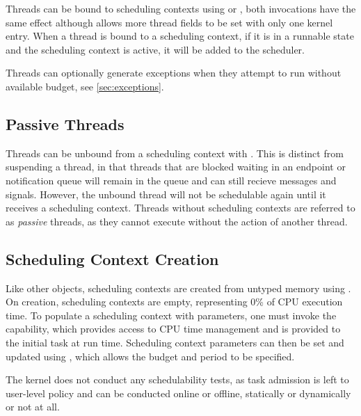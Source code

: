 Threads can be bound to scheduling contexts using  or
, both invocations have the same effect although  allows more thread fields to be set with only one kernel entry.
When a thread is bound to a scheduling context, if it is in a runnable state and the scheduling context is active, it will be added to the scheduler.

Threads can optionally generate exceptions when they attempt to run without available budget, see \autoref{sec:exceptions}.

\subsection{Passive Threads}
\label{sec:passive}

Threads can be unbound from a scheduling context with .
This is distinct from suspending a thread, in that threads that are blocked waiting in an endpoint or notification queue will remain
in the queue and can still recieve messages and signals.
However, the unbound thread will not be schedulable again until it receives a scheduling context.
Threads without scheduling contexts are referred to as \emph{passive} threads, as they cannot execute without the action of another thread.

\subsection{Scheduling Context Creation}
\label{sec:sc_creation}

Like other objects, scheduling contexts are created from untyped memory using .
On creation, scheduling contexts are empty, representing 0\% of CPU execution time.
To populate a scheduling context with parameters, one must invoke the  capability, which provides access to CPU time management and is provided to the initial task at run time.
Scheduling context parameters can then be set and updated using , which allows the budget and period to be specified.

The kernel does not conduct any schedulability tests, as task admission is left to user-level policy and can be conducted online or offline, statically or dynamically or not at all.

